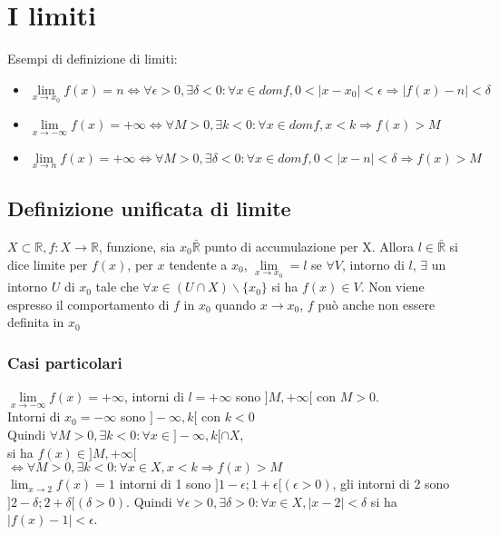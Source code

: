 \chapter{I limiti}
Esempi di definizione di limiti:
\begin{itemize}
\item $\lim\limits_{x\rightarrow x_0}f(x)=n\Leftrightarrow\forall \epsilon>0, \exists \delta<0: \forall x\in domf, 0<|x-x_0|<\epsilon\Rightarrow |f(x)-n|<\delta$\\
\item $\lim\limits_{x\rightarrow -\infty}f(x)=+\infty\Leftrightarrow\forall M>0, \exists k<0: \forall x\in domf, x<k\Rightarrow f(x)>M$\\
\item $\lim\limits_{x\rightarrow n}f(x)=+\infty\Leftrightarrow\forall M>0, \exists \delta<0: \forall x\in domf, 0<|x-n|<\delta\Rightarrow f(x)>M$\\
\end{itemize}
\section{Definizione unificata di limite}
$X\subset\mathbb{R}, f:X\rightarrow\mathbb{R}$, funzione, sia $x_0\bar{\mathbb{R}}$ punto di accumulazione per X. Allora $l\in\bar{\mathbb{R}}$ si dice limite per $f(x)$, per 
$x$ tendente a $x_0$, $\lim\limits_{x \rightarrow x_0}=l$ se $\forall V$, intorno di $l$, $\exists$ un intorno $U$ di $x_0$ tale che $\forall x\in (U\cap X)\backslash\{x_0\}$ si ha $f(x)\in V$. Non viene espresso il comportamento di $f$ in $x_0$ quando $x\rightarrow x_0$, $f$ pu\`o anche non essere definita in $x_0$
\subsection{Casi particolari}
$\lim\limits_{x\rightarrow -\infty} f(x)=+\infty$, intorni di $l=+\infty$ sono $]M,+\infty[$ con $M>0$.\\
Intorni di $x_0=-\infty$ sono $]-\infty,k[$ con $k<0$\\
Quindi $\forall M>0, \exists k<0:\forall x\in ]-\infty,k[\cap X$,\\
si ha $f(x)\in ]M,+\infty[$\\
$\Leftrightarrow \forall M>0, \exists k<0:\forall x\in X, x<k\Rightarrow f(x)>M$\\
$\lim_{x\rightarrow 2} f(x)=1$ intorni di 1 sono $]1-\epsilon;1+\epsilon[ (\epsilon>0)$, gli intorni di 2 sono $]2-\delta;2+\delta[(\delta>0)$. Quindi $\forall\epsilon>0, 
\exists \delta>0:\forall x\in X, |x-2|<\delta$ si ha $|f(x)-1|<\epsilon$.\\
